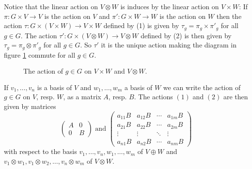 \begin{expls}
 Notice that the linear action on $V \otimes W$ is induces by the linear action on $V \times W$: If $\pi : G \times V \to V$ is the action on $V$ and $\pi' : G \times W \to W$ is the action on $W$ then the action $\tau : G \times (V \times W) \to V \times W$ defined by (1) is given by $\tau_g = \pi_g \times \pi'_g$ for all $g \in G$. The action $\tau': G \times (V \otimes W) \to V \otimes W$ defined by (2) is then given by $\tau_g = \pi_g \otimes \pi'_g$ for all $g \in G$. So $\tau'$ it is the unique action making the diagram in figure \ref{fig: action on product and tensor} commute for all $g \in G$.
 \begin{figure}\label{fig: action on product and tensor}\centering
  \caption{The action of $g \in G$ on $V \times W$ and $V \otimes W$.}
 \end{figure}
 
 If $v_1, \ldots, v_n$ is a basis of $V$ and $w_1, \ldots, w_m$ a basis of $W$ we can write the action of $g \in G$ on $V$, resp. $W$, as a matrix $A$, resp. $B$. The actions $(1)$ and $(2)$ are then given by matrices
 \[
  \begin{pmatrix}
   A & 0 \\
   0 & B
  \end{pmatrix}
  \text{ and }
  \begin{pmatrix}
   a_{11} B & a_{12} B & \cdots & a_{1m} B \\
   a_{21} B & a_{22} B & \cdots & a_{2m} B \\
    \vdots  &  \vdots  & \ddots &  \vdots  \\
   a_{n1} B & a_{n2} B & \cdots & a_{nm} B
  \end{pmatrix}
\]
with respect to the basis $v_1, \ldots, v_n, w_1, \ldots, w_m$ of $V \oplus W$ and $v_1 \otimes w_1, v_1 \otimes w_2, \ldots, v_n \otimes w_m$ of $V \otimes W$.
\end{expls}


